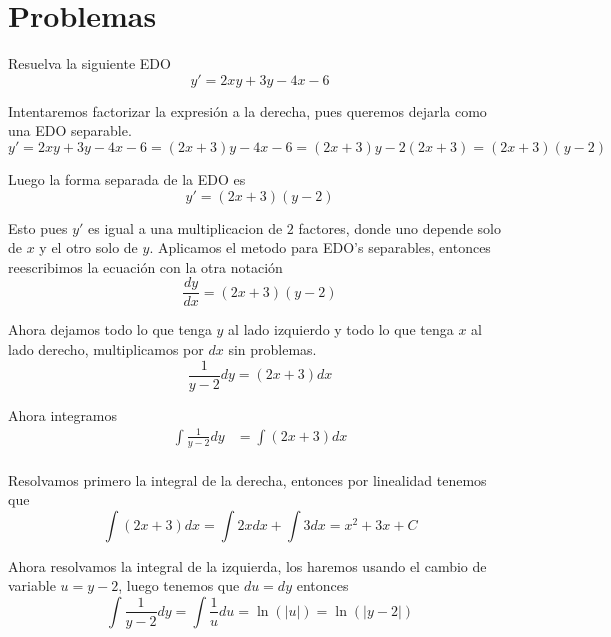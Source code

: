 \documentclass[a4paper,oneside,10.5pt]{article}
\begin{document}
\section*{Problemas}
\begin{prob}
  Resuelva la siguiente EDO
  \begin{equation*}
    y' = 2xy + 3y - 4x - 6
  \end{equation*}
\end{prob}
\begin{sol}
  Intentaremos factorizar la expresi\'on a la derecha, pues queremos dejarla como una EDO separable.
  \begin{equation*}
    y' = 2xy + 3y - 4x - 6 = (2x + 3)y - 4x - 6 = (2x + 3)y - 2(2x + 3) = (2x + 3)(y - 2)
  \end{equation*}

  Luego la forma separada de la EDO es
  \begin{equation*}
    y' = (2x + 3)(y - 2)
  \end{equation*}

  Esto pues $y'$ es igual a una multiplicacion de $2$ factores, donde uno depende solo de $x$ y el otro solo de $y$. Aplicamos el metodo para EDO's separables, entonces reescribimos la ecuaci\'on con la otra notaci\'on
  \begin{equation*}
   \frac{dy}{dx} = (2x + 3)(y - 2)
  \end{equation*}

  Ahora dejamos todo lo que tenga $y$ al lado izquierdo y todo lo que tenga $x$ al lado derecho, multiplicamos por $dx$ sin problemas.
  \begin{equation*}
    \frac{1}{y - 2} dy = (2x + 3) dx
  \end{equation*}

  Ahora integramos
  \begin{align*}
    \int \frac{1}{y - 2} dy &= \int (2x + 3) dx\\
  \end{align*}

  Resolvamos primero la integral de la derecha, entonces por linealidad tenemos que
  \begin{equation*}
    \int (2x + 3) dx = \int 2x dx + \int 3 dx = x^{2} + 3x + C
  \end{equation*}

  Ahora resolvamos la integral de la izquierda, los haremos usando el cambio de variable $u = y - 2$, luego tenemos que $du = dy$ entonces
  \begin{equation*}
    \int \frac{1}{y - 2} dy = \int \frac{1}{u} du = \ln (|u|) = \ln(|y - 2|)
  \end{equation*}


\end{sol}
\end{document}
